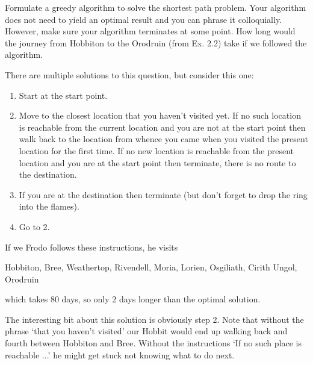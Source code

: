 
Formulate a greedy algorithm to solve the shortest path problem. Your algorithm does not need to yield an optimal result and you can phrase it colloquially. However, make sure your algorithm terminates at some point. How long would the journey from Hobbiton to the Orodruin (from Ex. 2.2) take if we followed the algorithm. 

\solution
There are multiple solutions to this question, but consider this one:
\begin{enumerate}[label=\arabic*.]
    \item Start at the start point. 
    \item Move to the closest location that you haven't visited yet. If no such location is reachable from the current location and you are not at the start point then walk back to the location from whence you came when you visited the present location for the first time. If no new location is reachable from the present location and you are at the start point then terminate, there is no route to the destination.
    \item If you are at the destination then terminate (but don't forget to drop the ring into the flames).
    \item Go to 2.
\end{enumerate}

\noindent{}If we Frodo follows these instructions, he visits
\begin{center}
Hobbiton, Bree, Weathertop, Rivendell, Moria, Lorien, Osgiliath, Cirith Ungol, Orodruin 
\end{center}
which takes 80 days, so only 2 days longer than the optimal solution.

The interesting bit about this solution is obviously step 2. Note that without the phrase `that you haven't visited' our Hobbit would end up walking back and fourth between Hobbiton and Bree. Without the instructions `If no such place is reachable ...' he might get stuck not knowing what to do next. 
